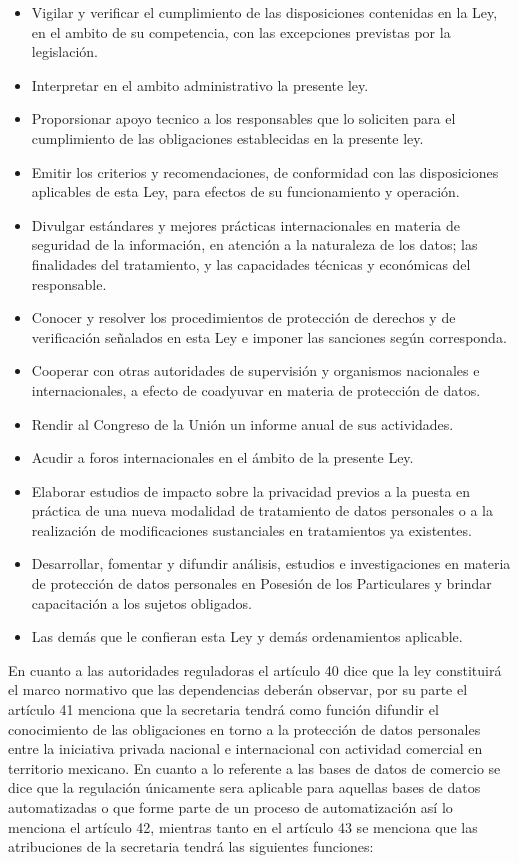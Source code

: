\documentclass[runningheads,a4paper]{llncs}
\begin{document}
\begin{itemize}
	\item Vigilar y verificar el cumplimiento de las disposiciones contenidas en la Ley, en el ambito de su competencia, con las excepciones previstas por la legislación.
	\item Interpretar en el ambito administrativo la presente ley.
	\item Proporsionar apoyo tecnico a los responsables que lo soliciten para el cumplimiento de las obligaciones establecidas en la presente ley.
	\item Emitir los criterios y recomendaciones, de conformidad con las disposiciones aplicables de esta
Ley, para efectos de su funcionamiento y operación.
	\item Divulgar estándares y mejores prácticas internacionales en materia de seguridad de la
información, en atención a la naturaleza de los datos; las finalidades del tratamiento, y las
capacidades técnicas y económicas del responsable.
	\item Conocer y resolver los procedimientos de protección de derechos y de verificación señalados en
esta Ley e imponer las sanciones según corresponda.
	\item Cooperar con otras autoridades de supervisión y organismos nacionales e internacionales, a
efecto de coadyuvar en materia de protección de datos. 
	\item Rendir al Congreso de la Unión un informe anual de sus actividades.
	\item Acudir a foros internacionales en el ámbito de la presente Ley.
	\item Elaborar estudios de impacto sobre la privacidad previos a la puesta en práctica de una nueva
modalidad de tratamiento de datos personales o a la realización de modificaciones sustanciales
en tratamientos ya existentes.
	\item Desarrollar, fomentar y difundir análisis, estudios e investigaciones en materia de protección de
datos personales en Posesión de los Particulares y brindar capacitación a los sujetos obligados.
	\item Las demás que le confieran esta Ley y demás ordenamientos aplicable.
\end{itemize} 

En cuanto a las autoridades reguladoras el artículo 40 dice que la ley constituirá el marco normativo que las dependencias deberán observar, por su parte el artículo 41 menciona que la secretaria tendrá como función difundir el conocimiento de las obligaciones en torno a la protección de datos personales entre la iniciativa privada nacional e internacional con actividad comercial en territorio mexicano. En cuanto a lo referente a las bases de datos de comercio se dice que la regulación únicamente sera aplicable para aquellas bases de datos automatizadas o que forme parte de un proceso de automatización así lo menciona el artículo 42, mientras tanto en el artículo 43 se menciona que las atribuciones de la secretaria tendrá las siguientes funciones: 
\end{document}
